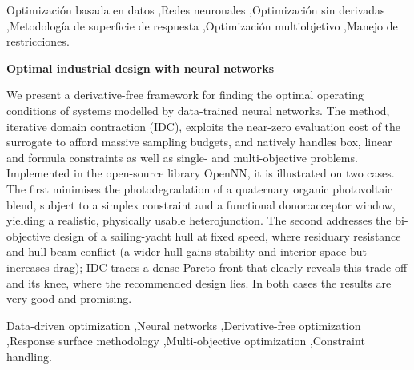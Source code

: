 \documentclass[5p,times,authoryear]{sciarticle}
\begin{document}
\begin{frontmatter}
\begin{keyword}
Optimización basada en datos \sep Redes neuronales \sep Optimización sin
derivadas \sep Metodología de superficie de respuesta \sep Optimización
multiobjetivo \sep Manejo de restricciones.
\end{keyword}

\begin{englishtitle}
\noindent \textbf{Optimal industrial design with neural networks}
\end{englishtitle}

\begin{abstractIng}
We present a derivative-free framework for finding the optimal operating
conditions of systems modelled by data-trained neural networks. The
method, iterative domain contraction (IDC), exploits the near-zero
evaluation cost of the surrogate to afford massive sampling budgets,
and natively handles box, linear and formula
constraints as well as single- and multi-objective problems. Implemented
in the open-source library OpenNN, it is illustrated on two cases. The
first minimises the photodegradation of a quaternary organic photovoltaic
blend, subject to a simplex constraint and a functional donor:acceptor
window, yielding a realistic, physically usable heterojunction. The second
addresses the bi-objective design of a sailing-yacht hull at fixed speed,
where residuary resistance and hull beam conflict (a wider hull gains
stability and interior space but increases drag); IDC traces a dense
Pareto front that clearly reveals this trade-off and its knee, where the
recommended design lies. In both cases the results are very good and
promising.
\end{abstractIng}

\begin{keywordIng}
Data-driven optimization \sep Neural networks \sep Derivative-free
optimization \sep Response surface methodology \sep Multi-objective
optimization \sep Constraint handling.
\end{keywordIng}

\end{frontmatter}
\end{document}
